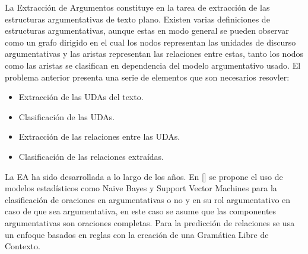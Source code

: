 



La Extracción de Argumentos constituye en la tarea de extracción de las estructuras argumentativas
de texto plano. Existen varias definiciones de estructuras argumentativas, aunque estas en modo
general se pueden observar como un grafo dirigido en el cual los nodos representan las unidades de
discurso argumentativas y las aristas representan las relaciones entre estas, tanto los nodos como
las aristas se clasifican en dependencia del modelo argumentativo usado. El problema anterior presenta
una serie de elementos que son necesarios resovler:

\begin{itemize}
    \item Extracción de las UDAs del texto.
    \item Clasificación de las UDAs.
    \item Extracción de las relaciones entre las UDAs.
    \item Clasificación de las relaciones extraídas.
\end{itemize}

La EA ha sido desarrollada a lo largo de los años. En [\cite{palau2009argumentation}] se propone
el uso de modelos estadísticos como Naive Bayes y Support Vector Machines para la clasificación de 
oraciones en argumentativas o no y en su rol argumentativo en caso de que sea argumentativa, en este
caso se asume que las componentes argumentativas son oraciones completas. Para la predicción de relaciones
se usa un enfoque basados en reglas con la creación de una Gramática Libre de Contexto.

